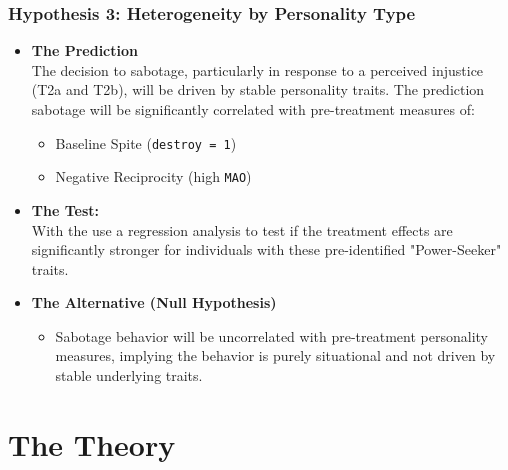 \documentclass[10pt]{beamer}
\begin{document}
\begin{frame}
  \frametitle{Hypothesis 3: Heterogeneity by Personality Type}
  \setlength{\leftmargini}{0pt}
    \begin{itemize}
    \item[] \textbf{The Prediction}\\
      The decision to sabotage, particularly in response to a perceived injustice (T2a and T2b), will be driven by stable personality traits. The prediction sabotage will be significantly correlated with pre-treatment measures of:
    \begin{itemize}
      \item Baseline Spite (\texttt{destroy = 1})
      \item Negative Reciprocity (high \texttt{MAO})
    \end{itemize}
    \item[] \textbf{The Test:}\\
    With the use a regression analysis to test if the treatment effects are significantly stronger for individuals with these pre-identified "Power-Seeker" traits.
    \item[] \textbf{The Alternative (Null Hypothesis)}
    \begin{itemize}
      \item Sabotage behavior will be uncorrelated with pre-treatment personality measures, implying the behavior is purely situational and not driven by stable underlying traits.
    \end{itemize}
  \end{itemize}
  \hspace{2em}
\end{frame}






\section{The Theory}
\end{document}
